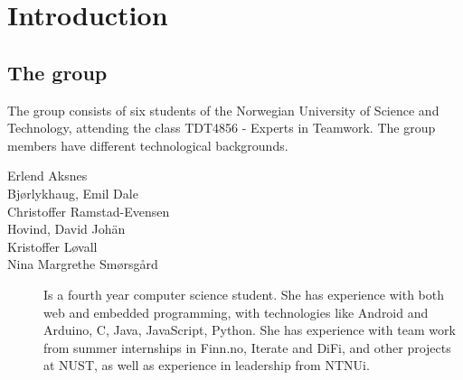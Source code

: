 \chapter{Introduction}
\section{The group}
The group consists of six students of the Norwegian University of Science and Technology, attending the class TDT4856 - Experts in Teamwork. The group members have different technological backgrounds.
\begin{description}
	\item[Erlend Aksnes] %
	\item[Bjørlykhaug, Emil Dale] %
	\item[Christoffer Ramstad-Evensen] %
	\item[Hovind, David Johän] %
	\item[Kristoffer Løvall] %
	\item[Nina Margrethe Smørsgård] \comment{\hfill \\}Is a fourth year computer science student. She has experience with both web and embedded programming, with technologies like Android and Arduino, C, Java, JavaScript, Python. She has experience with team work from summer internships in Finn.no, Iterate and DiFi, and other projects at NUST, as well as experience in leadership from NTNUi.
\end{description}